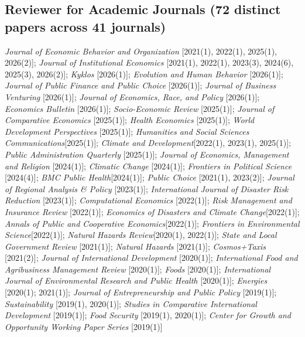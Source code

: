 \documentclass[12pt,letterpaper]{report}
\begin{document}
    \subsection*{Reviewer for Academic Journals \normalfont (72 distinct papers across 41 journals)}
    	\setlength\itemsep{-2pt}
            \textit{Journal of Economic Behavior and Organization} [2021(1), 2022(1), 2025(1), 2026(2)];
            \textit{Journal of Institutional Economics} [2021(1), 2022(1), 2023(3), 2024(6), 2025(3), 2026(2)];
            \textit{Kyklos} [2026(1)];
            \textit{Evolution and Human Behavior} [2026(1)];
            \textit{Journal of Public Finance and Public Choice} [2026(1)];
            \textit{Journal of Business Venturing} [2026(1)];
            \textit{Journal of Economics, Race, and Policy} [2026(1)];
            \textit{Economics Bulletin} [2026(1)];
            \textit{Socio-Economic Review} [2025(1)];
            \textit{Journal of Comparative Economics} [2025(1)];
            \textit{Health Economics} [2025(1)];
            \textit{World Development Perspectives} [2025(1)];
            \textit{Humanities and Social Sciences Communications}[2025(1)];
            \textit{Climate and Development}[2022(1), 2023(1), 2025(1)];
            \textit{Public Administration Quarterly} [2025(1)];
            \textit{Journal of Economics, Management and Religion} [2024(1)];
            \textit{Climatic Change} [2024(1)];
            \textit{Frontiers in Political Science} [2024(4)];
            \textit{BMC Public Health}[2024(1)];
            \textit{Public Choice} [2021(1), 2023(2)];
            \textit{Journal of Regional Analysis \& Policy} [2023(1)];
            \textit{International Journal of Disaster Risk Reduction} [2023(1)];
            \textit{Computational Economics} [2022(1)];
            \textit{Risk Management and Insurance Review} [2022(1)];
            \textit{Economics of Disasters and Climate Change}[2022(1)];
            \textit{Annals of Public and Cooperative Economics}[2022(1)];
            \textit{Frontiers in Environmental Science}[2022(1)];
            \textit{Natural Hazards Review}[2020(1), 2022(1)];
            \textit{State and Local Government Review} [2021(1)];
            \textit{Natural Hazards} [2021(1)];
            \textit{Cosmos+Taxis} [2021(2)];
            \textit{Journal of International Development} [2020(1)];
            \textit{International Food and Agribusiness Management Review} [2020(1)];
            \textit{Foods} [2020(1)];
            \textit{International Journal of Environmental Research and Public Health}   [2020(1)];
            \textit{Energies} [2020(1); 2021(1)];
            \textit{Journal of Entrepreneurship and Public Policy} [2019(1)];
            \textit{Sustainability} [2019(1), 2020(1)];
            \textit{Studies in Comparative International Development} [2019(1)];
            \textit{Food Security} [2019(1), 2020(1)];
            \textit{Center for Growth and Opportunity Working Paper Series} [2019(1)]
\end{document}
